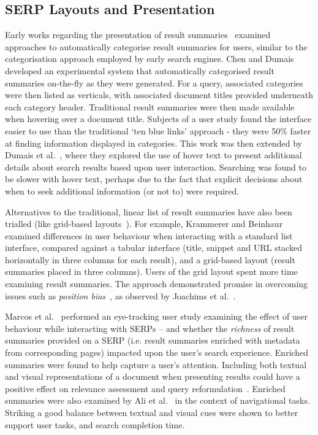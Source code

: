 \subsection{SERP Layouts and Presentation}
Early works regarding the presentation of result summaries~\cite{chen2000order_to_web, dumais2001results_in_context} examined approaches to automatically categorise result summaries for users, similar to the categorisation approach employed by early search engines. Chen and Dumais~\cite{chen2000order_to_web} developed an experimental system that automatically categorised result summaries on-the-fly as they were generated. For a query, associated categories were then listed as verticals, with associated document titles provided underneath each category header. Traditional result summaries were then made available when hovering over a document title. Subjects of a user study found the interface easier to use than the traditional `ten blue links' approach - they were 50\% faster at finding information displayed in categories. This work was then extended by Dumais et al.~\cite{dumais2001results_in_context}, where they explored the use of hover text to present additional details about search results based upon user interaction. Searching was found to be slower with hover text, perhaps due to the fact that explicit decisions about when to seek additional information (or not to) were required.

Alternatives to the traditional, linear list of result summaries have also been trialled (like grid-based layouts~\cite{chierichetti2011two_dimensional_presentation, kammerer2010interface, resnick2001modeling}). For example, Krammerer and Beinhaur~\cite{kammerer2010interface} examined differences in user behaviour when interacting with a standard list interface, compared against a tabular interface (title, snippet and URL stacked horizontally in three columns for each result), and a grid-based layout (result summaries placed in three columns). Users of the grid layout spent more time examining result summaries. The approach demonstrated promise in overcoming issues such as \emph{position bias}~\cite{craswell2008position_bias}, as observed by Joachims et al.~\cite{joachims2005clickdata}.

Marcos et al.~\cite{marcos2015snippets_web_search} performed an eye-tracking user study examining the effect of user behaviour while interacting with SERPs -- and whether the \emph{richness} of result summaries provided on a SERP (i.e. result summaries enriched with metadata from corresponding pages) impacted upon the user's search experience. Enriched summaries were found to help capture a user's attention. Including both textual and visual representations of a document when presenting results could have a positive effect on relevance assessment and query reformulation~\cite{joho2006presentation}. Enriched summaries were also examined by Ali et al.~\cite{ali2009interaction_interfaces} in the context of navigational tasks. Striking a good balance between textual and visual cues were shown to better support user tasks, and search completion time.

